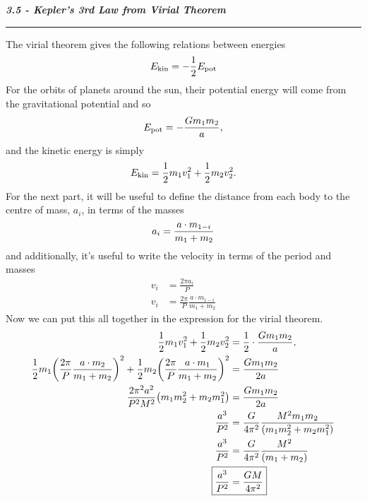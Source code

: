 \documentclass[12pt, letterpaper, twoside]{article}
\newcommand{\question}[1]{{\noindent \it #1}}
\newcommand{\answer}[1]{
    \par\noindent\rule{\textwidth}{0.4pt}#1\vspace{0.5cm}
}
\begin{document}
\question{\textbf{3.5 - Kepler's 3rd Law from Virial Theorem}}
\answer{
    The virial theorem gives the following relations between energies
    \begin{equation}
        E_{\rm kin} = - \frac{1}{2} E_{\rm pot}
    \end{equation}
    For the orbits of planets around the sun, their potential energy will come from the gravitational potential and so
    \begin{equation}
        E_{\rm pot} = - \frac{G m_1 m_2}{a},
    \end{equation}
    and the kinetic energy is simply
    \begin{equation}
        E_{\rm kin} = \frac{1}{2} m_1 v_1^2 + \frac{1}{2} m_2 v_2^2.
    \end{equation}
    For the next part, it will be useful to define the distance from each body to the centre of mass, $a_i$, in terms of the masses
    \begin{equation}
        a_i = \frac{a \cdot m_{1 - i}}{m_1 + m_2} \\
    \end{equation}
    and additionally, it's useful to write the velocity in terms of the period and masses
    \begin{align}
        v_i &= \frac{2 \pi a_i}{P} \\
        v_i &= \frac{2 \pi}{P} \frac{a \cdot m_{1 - i}}{m_1 + m_2}
    \end{align}
    Now we can put this all together in the expression for the virial theorem.
    \begin{align}
        \frac{1}{2} m_1 v_1^2 + \frac{1}{2} m_2 v_2^2 &= \frac{1}{2} \cdot \frac{G m_1 m_2}{a}, \\
        \frac{1}{2} m_1 \qty(\frac{2 \pi}{P} \frac{a \cdot m_2}{m_1 + m_2})^2 + \frac{1}{2} m_2  \qty(\frac{2 \pi}{P} \frac{a \cdot m_1}{m_1 + m_2})^2 &= \frac{G m_1 m_2}{2 a} \\
        \frac{2 \pi^2 a^2}{P^2 M^2} \qty( m_1 m_2^2 + m_2 m_1^2 ) &= \frac{G m_1 m_2}{2 a} \\
        \frac{a^3}{P^2} &= \frac{G}{4 \pi^2} \frac{M^2 m_1 m_2}{\qty( m_1 m_2^2 + m_2 m_1^2 )} \\
        \frac{a^3}{P^2} &= \frac{G}{4 \pi^2} \frac{M^2}{\qty( m_1 + m_2 )} \\
        \Aboxed{ \frac{a^3}{P^2} &= \frac{G M}{4 \pi^2} }
    \end{align}
}

\pagebreak
\end{document}
